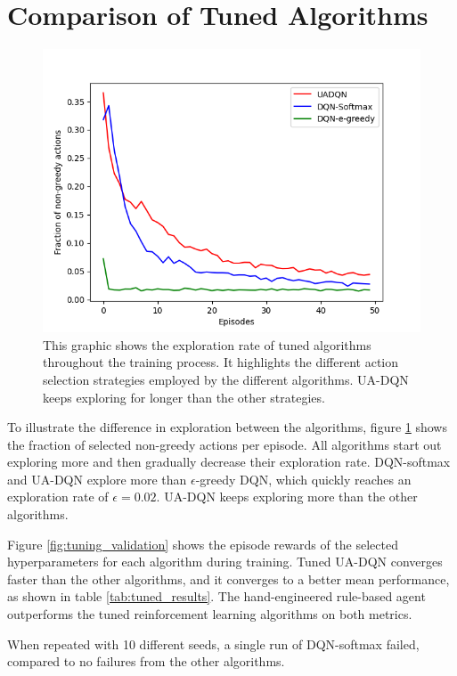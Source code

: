 \section{Comparison of Tuned Algorithms}
\begin{figure}
  \centering
  \includegraphics[width=\figurewidth]{figures/non-greedy-fraction.png}
  \caption{This graphic shows the exploration rate of tuned algorithms throughout the training process. It highlights the different action selection strategies employed by the different algorithms. UA-DQN keeps exploring for longer than the other strategies.}
  \label{fig:non_greedy_fraction}
\end{figure}
To illustrate the difference in exploration between the algorithms, figure \ref{fig:non_greedy_fraction} shows the fraction of selected non-greedy actions per episode.
All algorithms start out exploring more and then gradually decrease their exploration rate.
DQN-softmax and UA-DQN explore more than $\epsilon$-greedy DQN, which quickly reaches an exploration rate of $\epsilon = 0.02$.
UA-DQN keeps exploring more than the other algorithms.


Figure \ref{fig:tuning_validation} shows the episode rewards of the selected hyperparameters for each algorithm during training.
Tuned UA-DQN converges faster than the other algorithms, and it converges to a better mean performance, as shown in table \ref{tab:tuned_results}. The hand-engineered rule-based agent outperforms the tuned reinforcement learning algorithms on both metrics.

When repeated with 10 different seeds, a single run of DQN-softmax failed, compared to no failures from the other algorithms.



